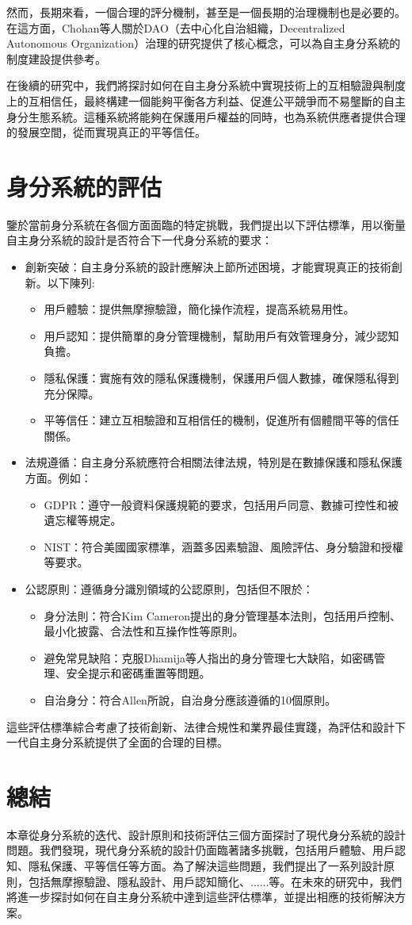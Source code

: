 然而，長期來看，一個合理的評分機制，甚至是一個長期的治理機制也是必要的。在這方面，Chohan等人\cite{chohan2024decentralized}關於DAO（去中心化自治組織，Decentralized Autonomous Organization）治理的研究提供了核心概念，可以為自主身分系統的制度建設提供參考。

在後續的研究中，我們將探討如何在自主身分系統中實現技術上的互相驗證與制度上的互相信任，最終構建一個能夠平衡各方利益、促進公平競爭而不易壟斷的自主身分生態系統。這種系統將能夠在保護用戶權益的同時，也為系統供應者提供合理的發展空間，從而實現真正的平等信任。
\section{身分系統的評估}
鑒於當前身分系統在各個方面面臨的特定挑戰，我們提出以下評估標準，用以衡量自主身分系統的設計是否符合下一代身分系統的要求：
\begin{itemize}
  \item 創新突破：自主身分系統的設計應解決上節所述困境，才能實現真正的技術創新。以下陳列:
        \begin{itemize}
          \item 用戶體驗：提供無摩擦驗證，簡化操作流程，提高系統易用性。
          \item 用戶認知：提供簡單的身分管理機制，幫助用戶有效管理身分，減少認知負擔。
          \item 隱私保護：實施有效的隱私保護機制，保護用戶個人數據，確保隱私得到充分保障。
          \item 平等信任：建立互相驗證和互相信任的機制，促進所有個體間平等的信任關係。
        \end{itemize}
  \item 法規遵循：自主身分系統應符合相關法律法規，特別是在數據保護和隱私保護方面。例如：
        \begin{itemize}
          \item GDPR：遵守一般資料保護規範\cite{GDPR2016}的要求，包括用戶同意、數據可控性和被遺忘權等規定。
          \item NIST：符合美國國家標準\cite{NIST800-63-3}，涵蓋多因素驗證、風險評估、身分驗證和授權等要求。
        \end{itemize}
  \item 公認原則：遵循身分識別領域的公認原則，包括但不限於：
        \begin{itemize}
          \item 身分法則：符合Kim Cameron提出的身分管理基本法則\cite{cameron2005laws}，包括用戶控制、最小化披露、合法性和互操作性等原則。
          \item 避免常見缺陷：克服Dhamija等人\cite{dhamija2008sevenflaws}指出的身分管理七大缺陷，如密碼管理、安全提示和密碼重置等問題。
          \item 自治身分：符合Allen\cite{allen2016selfsovereign}所說，自治身分應該遵循的10個原則。
        \end{itemize}
\end{itemize}
這些評估標準綜合考慮了技術創新、法律合規性和業界最佳實踐，為評估和設計下一代自主身分系統提供了全面的合理的目標。
\section{總結}
本章從身分系統的迭代、設計原則和技術評估三個方面探討了現代身分系統的設計問題。我們發現，現代身分系統的設計仍面臨著諸多挑戰，包括用戶體驗、用戶認知、隱私保護、平等信任等方面。為了解決這些問題，我們提出了一系列設計原則，包括無摩擦驗證、隱私設計、用戶認知簡化、......等。在未來的研究中，我們將進一步探討如何在自主身分系統中達到這些評估標準，並提出相應的技術解決方案。